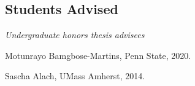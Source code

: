 \documentclass[overlapped,line]{res}
\begin{document}
\begin{resume}



\section{\bf Students Advised}
\vspace{.1cm}
\hspace{-1cm} \emph{Undergraduate honors thesis advisees}
\begin{etaremune} 
\item Motunrayo Bamgbose-Martins, Penn State, 2020.
\item Sascha Alach, UMass Amherst, 2014.
\end{etaremune}


\end{resume}
\end{document}

